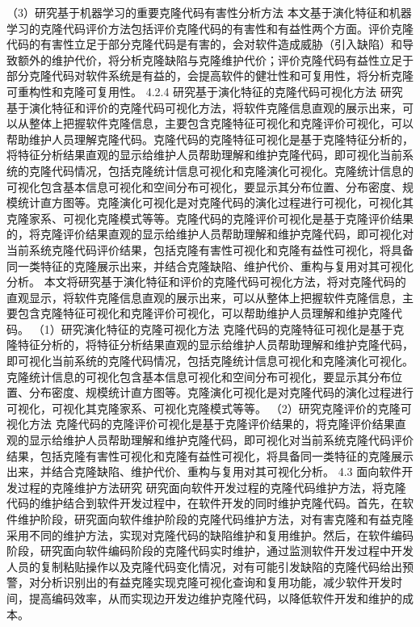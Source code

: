 （3）研究基于机器学习的重要克隆代码有害性分析方法
本文基于演化特征和机器学习的克隆代码评价方法包括评价克隆代码的有害性和有益性两个方面。评价克隆代码的有害性立足于部分克隆代码是有害的，会对软件造成威胁（引入缺陷）和导致额外的维护代价，将分析克隆缺陷与克隆维护代价；评价克隆代码有益性立足于部分克隆代码对软件系统是有益的，会提高软件的健壮性和可复用性，将分析克隆可重构性和克隆可复用性。
4.2.4 研究基于演化特征的克隆代码可视化方法
研究基于演化特征和评价的克隆代码可视化方法，将软件克隆信息直观的展示出来，可以从整体上把握软件克隆信息，主要包含克隆特征可视化和克隆评价可视化，可以帮助维护人员理解克隆代码。克隆代码的克隆特征可视化是基于克隆特征分析的，将特征分析结果直观的显示给维护人员帮助理解和维护克隆代码，即可视化当前系统的克隆代码情况，包括克隆统计信息可视化和克隆演化可视化。克隆统计信息的可视化包含基本信息可视化和空间分布可视化，要显示其分布位置、分布密度、规模统计直方图等。克隆演化可视化是对克隆代码的演化过程进行可视化，可视化其克隆家系、可视化克隆模式等等。克隆代码的克隆评价可视化是基于克隆评价结果的，将克隆评价结果直观的显示给维护人员帮助理解和维护克隆代码，即可视化对当前系统克隆代码评价结果，包括克隆有害性可视化和克隆有益性可视化，将具备同一类特征的克隆展示出来，并结合克隆缺陷、维护代价、重构与复用对其可视化分析。
本文将研究基于演化特征和评价的克隆代码可视化方法，将对克隆代码的直观显示，将软件克隆信息直观的展示出来，可以从整体上把握软件克隆信息，主要包含克隆特征可视化和克隆评价可视化，可以帮助维护人员理解和维护克隆代码。
（1）研究演化特征的克隆可视化方法
克隆代码的克隆特征可视化是基于克隆特征分析的，将特征分析结果直观的显示给维护人员帮助理解和维护克隆代码，即可视化当前系统的克隆代码情况，包括克隆统计信息可视化和克隆演化可视化。克隆统计信息的可视化包含基本信息可视化和空间分布可视化，要显示其分布位置、分布密度、规模统计直方图等。克隆演化可视化是对克隆代码的演化过程进行可视化，可视化其克隆家系、可视化克隆模式等等。
（2）研究克隆评价的克隆可视化方法
克隆代码的克隆评价可视化是基于克隆评价结果的，将克隆评价结果直观的显示给维护人员帮助理解和维护克隆代码，即可视化对当前系统克隆代码评价结果，包括克隆有害性可视化和克隆有益性可视化，将具备同一类特征的克隆展示出来，并结合克隆缺陷、维护代价、重构与复用对其可视化分析。
4.3 面向软件开发过程的克隆维护方法研究
研究面向软件开发过程的克隆代码维护方法，将克隆代码的维护结合到软件开发过程中，在软件开发的同时维护克隆代码。首先，在软件维护阶段，研究面向软件维护阶段的克隆代码维护方法，对有害克隆和有益克隆采用不同的维护方法，实现对克隆代码的缺陷维护和复用维护。然后，在软件编码阶段，研究面向软件编码阶段的克隆代码实时维护，通过监测软件开发过程中开发人员的复制粘贴操作以及克隆代码变化情况，对有可能引发缺陷的克隆代码给出预警，对分析识别出的有益克隆实现克隆可视化查询和复用功能，减少软件开发时间，提高编码效率，从而实现边开发边维护克隆代码，以降低软件开发和维护的成本。
